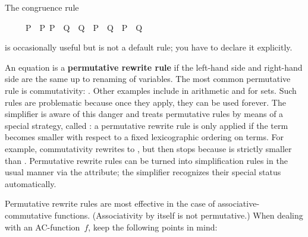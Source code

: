 \begin{isabellebody}
\begin{isamarkuptext}
\begin{warn}
The congruence rule 
\begin{isabelle}%
\ \ \ \ \ {\isasymlbrakk}P\ {\isacharequal}\ P{\isacharprime}{\isacharsemicolon}\ P{\isacharprime}\ {\isasymLongrightarrow}\ Q\ {\isacharequal}\ Q{\isacharprime}{\isasymrbrakk}\ {\isasymLongrightarrow}\ {\isacharparenleft}P\ {\isasymand}\ Q{\isacharparenright}\ {\isacharequal}\ {\isacharparenleft}P{\isacharprime}\ {\isasymand}\ Q{\isacharprime}{\isacharparenright}%
\end{isabelle}
\par\noindent
is occasionally useful but is not a default rule; you have to declare it explicitly.
\end{warn}%
\end{isamarkuptext}%
%
%
\begin{isamarkuptext}%
%
An equation is a \textbf{permutative rewrite rule} if the left-hand
side and right-hand side are the same up to renaming of variables.  The most
common permutative rule is commutativity: .  Other examples
include  in arithmetic and  for sets. Such rules are problematic because
once they apply, they can be used forever. The simplifier is aware of this
danger and treats permutative rules by means of a special strategy, called
: a permutative rewrite
rule is only applied if the term becomes smaller with respect to a fixed
lexicographic ordering on terms. For example, commutativity rewrites
 to , but then stops because  is strictly
smaller than .  Permutative rewrite rules can be turned into
simplification rules in the usual manner via the  attribute; the
simplifier recognizes their special status automatically.

Permutative rewrite rules are most effective in the case of
associative-commutative functions.  (Associativity by itself is not
permutative.)  When dealing with an AC-function~$f$, keep the
following points in mind:
\begin{itemize}
  

\end{itemize}
\end{isamarkuptext}
\end{isabellebody}
